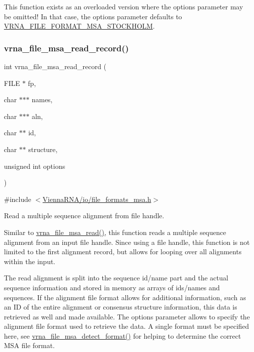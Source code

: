This function exists as an overloaded version where the {\ttfamily options} parameter may be omitted! In that case, the {\ttfamily options} parameter defaults to \mbox{\hyperlink{group__file__formats__msa_ga62be992445cd8ab2ad7a8fded944338b}{V\+R\+N\+A\+\_\+\+F\+I\+L\+E\+\_\+\+F\+O\+R\+M\+A\+T\+\_\+\+M\+S\+A\+\_\+\+S\+T\+O\+C\+K\+H\+O\+LM}}. \mbox{\label{group__file__formats__msa_gad4203a438622b2df7bc2f16578d54799}} 
\subsubsection{\texorpdfstring{vrna\_file\_msa\_read\_record()}{vrna\_file\_msa\_read\_record()}}
{\footnotesize\ttfamily int vrna\+\_\+file\+\_\+msa\+\_\+read\+\_\+record (\begin{DoxyParamCaption}\item[{F\+I\+LE $\ast$}]{fp,  }\item[{char $\ast$$\ast$$\ast$}]{names,  }\item[{char $\ast$$\ast$$\ast$}]{aln,  }\item[{char $\ast$$\ast$}]{id,  }\item[{char $\ast$$\ast$}]{structure,  }\item[{unsigned int}]{options }\end{DoxyParamCaption})}



{\ttfamily \#include $<$\mbox{\hyperlink{io_2file__formats__msa_8h}{Vienna\+R\+N\+A/io/file\+\_\+formats\+\_\+msa.\+h}}$>$}



Read a multiple sequence alignment from file handle. 

Similar to \mbox{\hyperlink{group__file__formats__msa_gad02d5d12bda54611c915a1019323b7be}{vrna\+\_\+file\+\_\+msa\+\_\+read()}}, this function reads a multiple sequence alignment from an input file handle. Since using a file handle, this function is not limited to the first alignment record, but allows for looping over all alignments within the input.

The read alignment is split into the sequence id/name part and the actual sequence information and stored in memory as arrays of ids/names and sequences. If the alignment file format allows for additional information, such as an ID of the entire alignment or consensus structure information, this data is retrieved as well and made available. The {\ttfamily options} parameter allows to specify the alignment file format used to retrieve the data. A single format must be specified here, see \mbox{\hyperlink{group__file__formats__msa_gade4fa8136ebb2d0f7eb3f8b59a8658e3}{vrna\+\_\+file\+\_\+msa\+\_\+detect\+\_\+format()}} for helping to determine the correct M\+SA file format.

